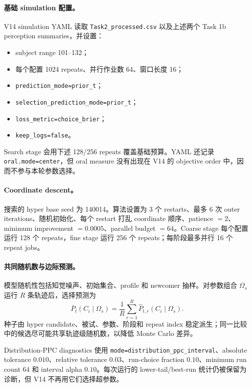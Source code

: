 \paragraph{基础 simulation 配置。}
V14 simulation YAML 读取 \texttt{Task2\_processed.csv} 以及上述两个 Task 1b perception summaries，并设置：
\begin{itemize}
    \item subject range 101--132；
    \item 每个配置 1024 repeats、并行作业数 64、窗口长度 16；
    \item \texttt{prediction\_mode=prior\_t}；
    \item \texttt{selection\_prediction\_mode=prior\_t}；
    \item \texttt{loss\_metric=choice\_brier}；
    \item \texttt{keep\_logs=false}。
\end{itemize}
Search stage 会用下述 128/256 repeats 覆盖基础预算。YAML 还记录 \texttt{oral.mode=center}，但 oral measure 没有出现在 V14 的 objective order 中，因而不参与本轮参数选择。

\paragraph{Coordinate descent。}
搜索的 hyper base seed 为 140014。算法设置为 3 个 restarts、最多 6 次 outer iterations、随机初始化、每个 restart 打乱 coordinate 顺序、patience $=2$、minimum improvement $=0.0005$、parallel budget $=64$。Coarse stage 每个配置运行 128 个 repeats，fine stage 运行 256 个 repeats；每阶段最多并行 16 个 repeat jobs。

\paragraph{共同随机数与边际预测。}
模型随机性包括知觉噪声、初始集合、profile 和 newcomer 抽样。对参数组合 $\Omega_s$ 运行 $R$ 条轨迹后，选择预测为
\begin{equation}
    \overline P_t(C_i\mid\Omega_s)
    =
    \frac{1}{R}
    \sum_{r=1}^{R}
    \widehat P_{t,r}(C_i\mid\Omega_s).
    \label{eq:modelv14-marginal-choice}
\end{equation}
种子由 hyper candidate、被试、参数、阶段和 repeat index 稳定派生；同一比较中的候选尽可能共享轨迹级随机数，以降低 Monte Carlo 差异。

Distribution-PPC diagnostics 使用 \texttt{mode=distribution\_ppc\_interval}、absolute tolerance $0.010$、relative tolerance $0.03$、run-choice fraction $0.10$、minimum run count $64$ 和 interval alpha $0.10$。每次运行的 lower-tail/best-run 统计仍被保留为诊断，但 V14 不再用它们选择超参数。

